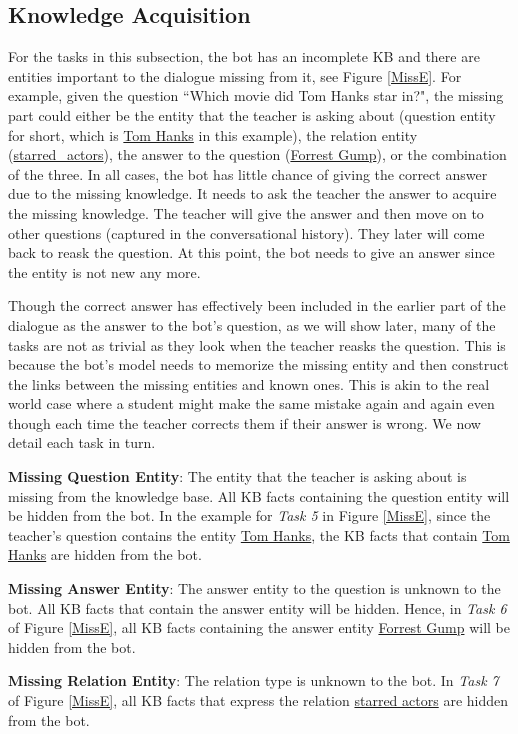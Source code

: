 \subsection{Knowledge Acquisition} \label{sec:knolaq}
For the tasks in this subsection, the bot has an
incomplete KB and there are entities important to the dialogue missing from it,
see Figure \ref{MissE}.
For example, given the question  ``Which movie did Tom Hanks star in?",
the missing part could either be the entity that the teacher is asking about
(question entity for short, which is \underline{Tom Hanks} in this example),
the relation entity (\underline{starred\_actors}), the answer to the question (\underline{Forrest Gump}),
or the combination of the three.
In all cases, the bot has little chance of giving the correct answer due to the missing knowledge.
It needs to ask the teacher the answer to acquire the missing knowledge.
The teacher will give the answer and then move on to other questions (captured in the conversational history). They later will come back to reask the question.
At this point, the bot needs to give an answer since the entity is not new any more.

Though the correct answer has effectively been included in the earlier part of the dialogue as the answer to the bot's question, as we will show later, many of the tasks are not as trivial as they look when the teacher reasks the question. This is because the bot's model needs to memorize the missing entity and then construct the links between the missing entities and known ones. This is akin to the real world case where a student might make the same mistake again and again even though each time the teacher corrects them if their answer is wrong. We now detail each task in turn.

{\bf Missing Question Entity}:    The entity
that
the teacher is asking about is missing from the knowledge base.
All KB facts containing the question entity will be hidden from the bot. In the example for {\it Task 5} in Figure \ref{MissE}, since the teacher's question contains the entity \underline{Tom Hanks}, the KB facts that contain \underline{Tom Hanks} are  hidden from the bot.

{\bf Missing Answer Entity}:
The answer entity to the question is unknown to the bot.
All KB facts that contain the answer entity will be hidden. Hence, in {\it Task 6} of Figure \ref{MissE}, all KB facts containing the answer entity \underline{Forrest Gump} will be hidden from the bot.

{\bf Missing Relation Entity}:
The relation type is unknown to the bot.
In {\it Task 7} of Figure \ref{MissE},
all KB facts that express the relation \underline{starred actors} are hidden from the bot.

